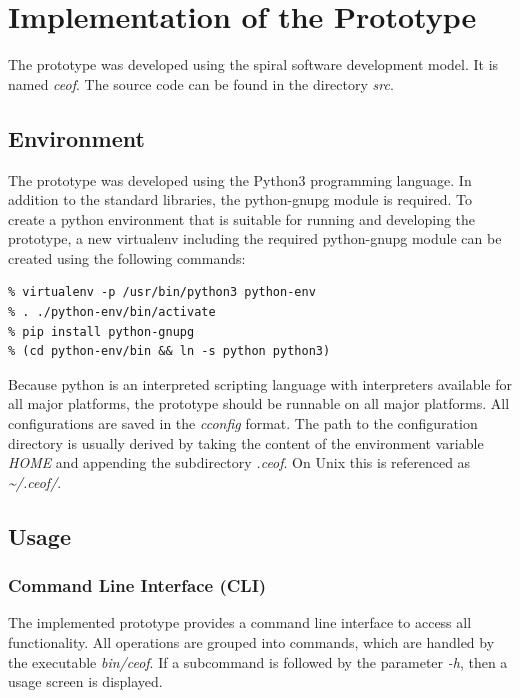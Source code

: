 \chapter{Implementation of the Prototype}
The prototype was developed using the spiral software development model.
It is named \textit{ceof}. The source code can be found in the 
directory \textit{src}.
\section{Environment}
The prototype was developed using the Python3 programming language.
In addition to the standard libraries, the python-gnupg module is required.
To create a python environment that is suitable for running and developing
the prototype, a new virtualenv including the required python-gnupg module
can be created using the following commands:
\begin{verbatim}
% virtualenv -p /usr/bin/python3 python-env
% . ./python-env/bin/activate
% pip install python-gnupg
% (cd python-env/bin && ln -s python python3)
\end{verbatim}
Because python is an interpreted scripting language with interpreters
available for all major platforms, the prototype should be runnable
on all major platforms.
All configurations are saved in the \textit{cconfig}\cite{cconfig} format.
The path to the configuration directory is usually derived by taking
the content of the environment variable \textit{HOME} and appending
the subdirectory \textit{.ceof}. On Unix this is referenced as
\textit{\textasciitilde{}/.ceof/}.
\section{Usage}
\subsection{Command Line Interface (CLI)}
The implemented prototype provides a command line interface to access
all functionality.
All operations are grouped into commands, which are handled by the
executable \textit{bin/ceof}. If a subcommand is followed by the parameter
\textit{-h}, then a usage screen is displayed.
